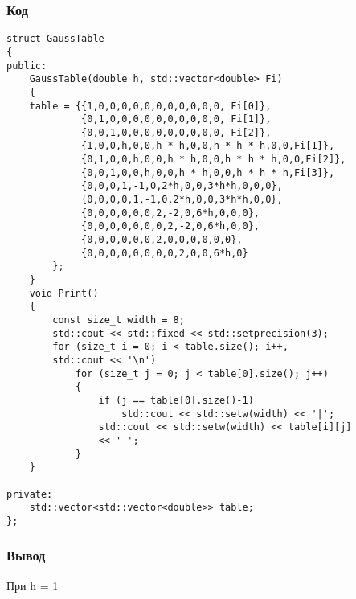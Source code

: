 \documentclass[bachelor, och, pract]{SCWorks}
\begin{document}
\subsubsection{Код}

\begin{lstlisting}
struct GaussTable
{
public:
    GaussTable(double h, std::vector<double> Fi)
    {
    table = {{1,0,0,0,0,0,0,0,0,0,0,0, Fi[0]},
             {0,1,0,0,0,0,0,0,0,0,0,0, Fi[1]},
             {0,0,1,0,0,0,0,0,0,0,0,0, Fi[2]},
             {1,0,0,h,0,0,h * h,0,0,h * h * h,0,0,Fi[1]},
             {0,1,0,0,h,0,0,h * h,0,0,h * h * h,0,0,Fi[2]},
             {0,0,1,0,0,h,0,0,h * h,0,0,h * h * h,Fi[3]},
             {0,0,0,1,-1,0,2*h,0,0,3*h*h,0,0,0},
             {0,0,0,0,1,-1,0,2*h,0,0,3*h*h,0,0},
             {0,0,0,0,0,0,2,-2,0,6*h,0,0,0},
             {0,0,0,0,0,0,0,2,-2,0,6*h,0,0},
             {0,0,0,0,0,0,2,0,0,0,0,0,0},
             {0,0,0,0,0,0,0,0,2,0,0,6*h,0}
        };
    }
    void Print()
    {
        const size_t width = 8;
        std::cout << std::fixed << std::setprecision(3);
        for (size_t i = 0; i < table.size(); i++, 
        std::cout << '\n')
            for (size_t j = 0; j < table[0].size(); j++)
            {
                if (j == table[0].size()-1)
                    std::cout << std::setw(width) << '|';
                std::cout << std::setw(width) << table[i][j] 
                << ' ';
            }
    }

private:
    std::vector<std::vector<double>> table;
};
\end{lstlisting}


\subsubsection{Вывод}

При h = 1
\end{document}
